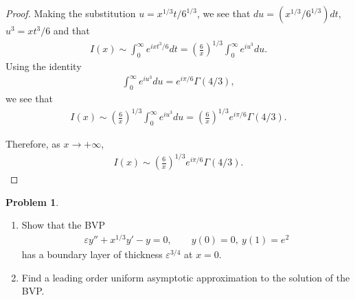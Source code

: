 \documentclass[12pt]{article}
\theoremstyle{definition}
\newtheorem{problem}{Problem}
\begin{document}
\begin{proof}
  Making the substitution $u = x^{1/3}t/6^{1/3}$, we see that $du = (x^{1/3}/6^{1/3}) dt$, $u^3 = x t^3 / 6$ and that
  \begin{align*}
    I(x) \sim \int_0^\infty e^{ix t^3/6} dt = \left(\frac{6}{x}\right)^{1/3}\int_0^\infty e^{iu^3} du.
  \end{align*}
  Using the identity
  \begin{align*}
    \int_0^\infty e^{iu^3} du = e^{i \pi/6}\Gamma(4/3),
  \end{align*}
  we see that
  \begin{align*}
    I(x) \sim \left(\frac{6}{x}\right)^{1/3}\int_0^\infty e^{iu^3} du = \left(\frac{6}{x}\right)^{1/3}e^{i \pi/6}\Gamma(4/3).
  \end{align*}

  Therefore, as $x \to +\infty$,
  \begin{align*}
    I(x) \sim \left(\frac{6}{x}\right)^{1/3}e^{i \pi/6}\Gamma(4/3).
  \end{align*}
\end{proof}
\newpage


\begin{problem}
  \begin{enumerate}
    \item Show that the BVP
      \begin{align*}
        \varepsilon y'' + x^{1/3} y' -y = 0, \qquad y(0)=0,\ y(1) = e^2
      \end{align*}
      has a boundary layer of thickness $\varepsilon^{3/4}$ at $x=0$.
    \item Find a leading order uniform asymptotic approximation to the solution of the BVP.
  \end{enumerate}
\end{problem}
\end{document}
